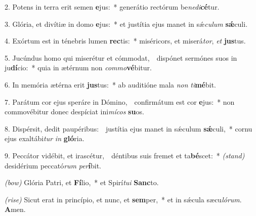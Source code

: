 2. Potens in terra erit semen \textbf{e}jus:~*
	generátio rectórum be\textit{ne}\textit{di}\textbf{cé}tur.

3. Glória, et divítiæ in domo \textbf{e}jus:~*
	et justítia ejus manet in s\'{\ae}\textit{cu}\textit{lum} \textbf{s\'{\ae}}culi.

4. Exórtum est in ténebris lumen \textbf{rec}tis:~*
	miséricors, et miserá\textit{tor}, \textit{et} \textbf{jus}tus.

5. Jucúndus homo qui miserétur et cómmodat,~\GreDagger\
	dispónet sermónes suos in ju\textbf{dí}cio:~* quia in ætérnum non \textit{com}\textit{mo}\textbf{vé}bitur.

6. In memória ætérna erit \textbf{jus}tus:~*
	ab auditióne mala \textit{non} \textit{ti}\textbf{mé}bit.

7. Parátum cor ejus speráre in Dómino,~\GreDagger\
	confirmátum est cor \textbf{e}jus:~* non commovébitur donec despíciat ini\textit{mí}\textit{cos} \textbf{su}os.

8. Dispérsit, dedit paupéribus:~\GreDagger\
	justítia ejus manet in s\'{\ae}culum \textbf{s\'{\ae}}\-culi,~*
	cornu ejus exaltábi\textit{tur} \textit{in} \textbf{gló}ria.

9. Peccátor vidébit, et irascétur,~\GreDagger\
	déntibus suis fremet et ta\textbf{bé}scet:~* {\color{red}\textit{(stand)}}
	desidérium peccató\textit{rum} \textit{per}\textbf{í}bit.

{\color{red}\textit{(bow)}} Glória Patri, et \textbf{Fí}lio,~*
	et Spirí\textit{tu}\textit{i} \textbf{Sanc}to.

{\color{red}\textit{(rise)}} Sicut erat in princípio, et nunc, et \textbf{sem}per,~*
	et in s\'{\ae}cula sæcu\textit{ló}\textit{rum}. \textbf{A}men.